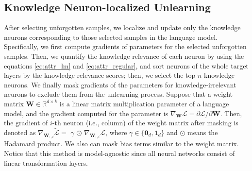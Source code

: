 \subsection{Knowledge Neuron-localized Unlearning}
After selecting unforgotten samples, we localize and update only the knowledge neurons corresponding to those selected samples in the language model.
Specifically, we first compute gradients of parameters for the selected unforgotten samples.
Then, we quantify the knowledge relevance of each neuron by using the equations \ref{eq:attr_lm} and \ref{eq:attr_regular}, and sort neurons of the whole target layers by the knowledge relevance scores; then, we select the top-$n$ knowledge neurons.
We finally mask gradients of the parameters for knowledge-irrelevant neurons to exclude them from the unlearning process.
Suppose that a weight matrix $\mathbf{W} \in \mathbb{R}^{d \times k}$ is a linear matrix multiplication parameter of a language model, and the gradient computed for the parameter is $\nabla_{\mathbf{W}} \mathcal{L} = \partial \mathcal{L} / \partial \mathbf{W}$.
Then, the gradient of $i$-th neuron (i.e., column) of the weight matrix after masking is denoted as $\nabla_{\mathbf{W}_{:,i}} \tilde{\mathcal{L}}=$ $\gamma$ $\odot$ $\nabla_{\mathbf{W}_{:,i}} \mathcal{L}$, where $\gamma \in \{\mathbf{0}_{d}, \mathbf{1}_{d}\}$ and $\odot$ means the Hadamard product.
We also can mask bias terms similar to the weight matrix.
Notice that this method is model-agnostic since all neural networks consist of linear transformation layers.



